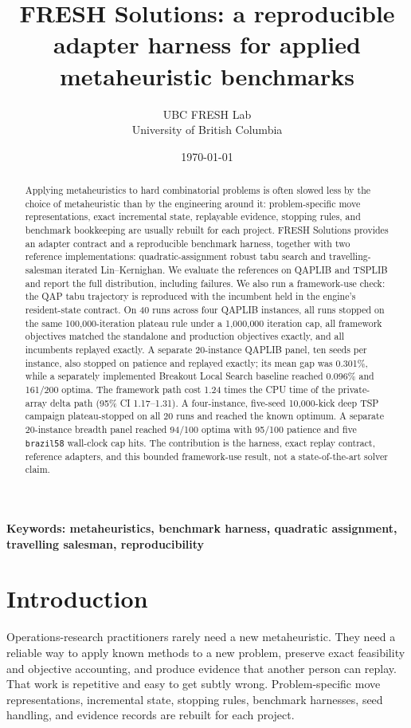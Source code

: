 \documentclass[11pt]{article}
\title{FRESH Solutions: a reproducible adapter harness for applied metaheuristic benchmarks}
\author{UBC FRESH Lab\\University of British Columbia}
\date{\today}
\begin{document}
\maketitle

\begin{abstract}
Applying metaheuristics to hard combinatorial problems is often slowed less by the choice of
metaheuristic than by the engineering around it: problem-specific move representations, exact
incremental state, replayable evidence, stopping rules, and benchmark bookkeeping are usually rebuilt
for each project. FRESH Solutions provides an adapter contract and a reproducible benchmark harness,
together with two reference implementations: quadratic-assignment robust tabu search and
travelling-salesman iterated Lin--Kernighan. We evaluate the references on QAPLIB and TSPLIB and report
the full distribution, including failures. We also run a framework-use check: the QAP tabu trajectory
is reproduced with the incumbent held in the engine's resident-state contract. On 40 runs across four
QAPLIB instances, all runs stopped on the same 100,000-iteration plateau rule under a 1,000,000
iteration cap, all framework objectives matched the standalone and production objectives exactly, and
all incumbents replayed exactly. A separate 20-instance QAPLIB panel, ten seeds per instance, also stopped on patience and replayed
exactly; its mean gap was 0.301\%, while a separately implemented Breakout Local Search baseline reached
0.096\% and 161/200 optima. The framework path cost 1.24 times
the CPU time of the private-array delta path (95\% CI 1.17--1.31). A four-instance, five-seed 10,000-kick deep TSP campaign plateau-stopped on all 20 runs and reached the known optimum. A separate 20-instance breadth panel reached 94/100 optima with 95/100 patience and five \texttt{brazil58} wall-clock cap hits. The contribution is the harness, exact replay contract, reference
adapters, and this bounded framework-use result, not a state-of-the-art solver claim.
\end{abstract}

\noindent\textbf{Keywords: metaheuristics, benchmark harness, quadratic assignment, travelling salesman, reproducibility}

\section{Introduction}

Operations-research practitioners rarely need a new metaheuristic. They need a reliable way to apply
known methods to a new problem, preserve exact feasibility and objective accounting, and produce
evidence that another person can replay. That work is repetitive and easy to get subtly wrong.
Problem-specific move representations, incremental state, stopping rules, benchmark harnesses, seed
handling, and evidence records are rebuilt for each project.
\end{document}
